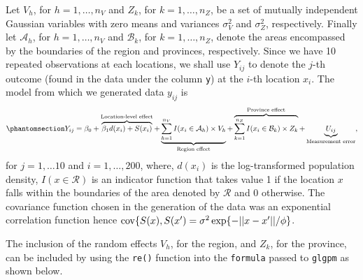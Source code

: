 \documentclass[
  letterpaper,
]{krantz}
\begin{document}
Let \(V_h\), for \(h=1,\ldots,n_V\) and \(Z_k\), for
\(k=1,\ldots,n_{Z}\), be a set of mutually independent Gaussian
variables with zero means and variances \(\sigma^2_{V}\) and
\(\sigma^2_{Z}\), respectively. Finally let \(\mathcal{A}_h\), for
\(h=1,\ldots,n_V\) and \(\mathcal{B}_k\), for \(k=1,\ldots,n_{Z}\),
denote the areas encompassed by the boundaries of the region and
provinces, respectively. Since we have 10 repeated observations at each
locations, we shall use \(Y_{ij}\) to denote the \(j\)-th outcome (found
in the data under the column \texttt{y}) at the \(i\)-th location
\(x_i\). The model from which we generated data \(y_{ij}\) is
\begin{equation}\phantomsection\label{eq-italy-sim-model}{
Y_{ij} = \beta_0 + \overbrace{\beta_1 d(x_i) + S(x_i)}^\text{Location-level effect} + \underbrace{\sum_{h=1}^{n_{V}} I(x_i \in \mathcal{A}_h) \times V_h}_\text{Region effect} +\\ \overbrace{\sum_{k=1}^{n_{Z}} I(x_i \in \mathcal{B}_k) \times Z_k}^\text{Province effect} +  \underbrace{U_{ij}}_\text{Measurement error},
}\end{equation} for \(j=1,\ldots 10\) and \(i=1,\ldots,200\), where,
\(d(x_i)\) is the log-transformed population density,
\(I(x \in \mathcal{R})\) is an indicator function that takes value 1 if
the location \(x\) falls within the boundaries of the area denoted by
\(\mathcal{R}\) and 0 otherwise. The covariance function chosen in the
generation of the data was an exponential correlation function hence
\({\rm cov}\{S(x), S(x') = \sigma^2 \exp\{-||x-x'||/\phi\}\).

The inclusion of the random effects \(V_h\), for the region, and
\(Z_k\), for the province, can be included by using the \texttt{re()}
function into the \texttt{formula} passed to \texttt{glgpm} as shown
below.
\end{document}
